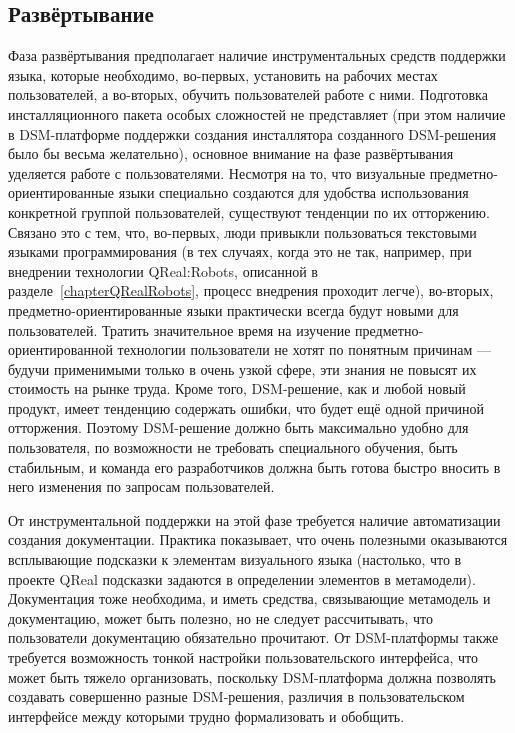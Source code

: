 \subsection{Развёртывание}
Фаза развёртывания предполагает наличие инструментальных средств поддержки языка, 
которые необходимо, во-первых, установить на рабочих местах пользователей, а во-вторых, 
обучить пользователей работе с ними. Подготовка инсталляционного пакета особых сложностей 
не представляет (при этом наличие в DSM-платформе поддержки создания инсталлятора созданного 
DSM-решения было бы весьма желательно), основное внимание на фазе развёртывания уделяется 
работе с пользователями. Несмотря на то, что визуальные предметно-ориентированные 
языки специально создаются для удобства использования конкретной группой пользователей, 
существуют тенденции по их отторжению. Связано это с тем, что, во-первых, люди привыкли 
пользоваться текстовыми языками программирования (в тех случаях, когда это не так, например, 
при внедрении технологии QReal:Robots, описанной в разделе~\ref{chapterQRealRobots}, 
процесс внедрения проходит легче), во-вторых, предметно-ориентированные языки практически 
всегда будут новыми для пользователей. Тратить значительное время на изучение предметно-ориентированной 
технологии пользователи не хотят по понятным причинам --- будучи применимыми только 
в очень узкой сфере, эти знания не повысят их стоимость на рынке труда. Кроме того, 
DSM-решение, как и любой новый продукт, имеет тенденцию содержать ошибки, что будет 
ещё одной причиной отторжения. Поэтому DSM-решение должно быть максимально удобно для 
пользователя, по возможности не требовать специального обучения, быть стабильным, 
и команда его разработчиков должна быть готова быстро вносить в него изменения по 
запросам пользователей.

От инструментальной поддержки на этой фазе требуется наличие автоматизации создания 
документации. Практика показывает, что очень полезными оказываются всплывающие подсказки 
к элементам визуального языка (настолько, что в проекте QReal подсказки задаются в 
определении элементов в метамодели). Документация тоже необходима, и иметь средства, 
связывающие метамодель и документацию, может быть полезно, но не следует рассчитывать, 
что пользователи документацию обязательно прочитают. От DSM-платформы также требуется 
возможность тонкой настройки пользовательского интерфейса, что может быть тяжело организовать,
поскольку DSM-платформа должна позволять создавать совершенно разные DSM-решения, 
различия в пользовательском интерфейсе между которыми трудно формализовать и обобщить.

